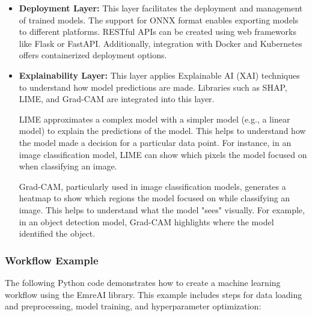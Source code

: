 \documentclass[conference]{IEEEtran}
\begin{document}
\begin{itemize}
    Hyperparameters, such as learning rate, batch size, and the number of layers, significantly affect model performance. This layer utilizes tools like Optuna, Ray Tune, and Hyperopt to automatically identify the optimal values for these parameters. These tools offer various optimization algorithms, including Bayesian optimization, genetic algorithms, and random search.
    
    Different machine learning algorithms (e.g., linear regression, support vector machines, random forests, neural networks) perform differently on various datasets. This layer tests various algorithms and selects the best-performing model.
    
    Techniques like k-fold cross-validation are used to assess the model’s generalization ability. This helps to prevent overfitting by evaluating how well the model performs on different subsets of data.
    
    \item \textbf{Deployment Layer:} This layer facilitates the deployment and management of trained models. The support for ONNX format enables exporting models to different platforms. RESTful APIs can be created using web frameworks like Flask or FastAPI. Additionally, integration with Docker and Kubernetes offers containerized deployment options.
    
    \item \textbf{Explainability Layer:} This layer applies Explainable AI (XAI) techniques to understand how model predictions are made. Libraries such as SHAP, LIME, and Grad-CAM are integrated into this layer.
    
    LIME approximates a complex model with a simpler model (e.g., a linear model) to explain the predictions of the model. This helps to understand how the model made a decision for a particular data point. For instance, in an image classification model, LIME can show which pixels the model focused on when classifying an image.
    
    Grad-CAM, particularly used in image classification models, generates a heatmap to show which regions the model focused on while classifying an image. This helps to understand what the model "sees" visually. For example, in an object detection model, Grad-CAM highlights where the model identified the object.
    
\end{itemize}



\subsubsection{Workflow Example}
The following Python code demonstrates how to create a machine learning workflow using the EmreAI library. This example includes steps for data loading and preprocessing, model training, and hyperparameter optimization:
\end{document}
